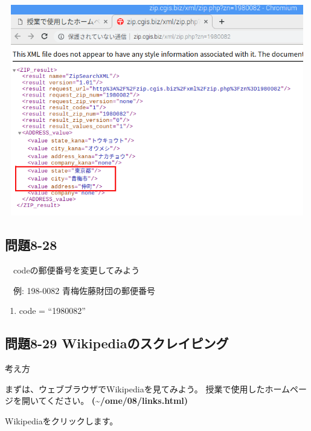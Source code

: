 \documentclass[a4paper,12pt,dvipdfmx]{jarticle}
\begin{document}
\begin{center}
\includegraphics[width=13.873cm,height=9.243cm]{textbook-img055.png}

\end{center}



\subsection*{問題8-28}
\ \ codeの郵便番号を変更してみよう

\ \ 例: 198-0082
青梅佐藤財団の郵便番号

\begin{center}
\begin{boxedminipage}{10.927cm}
\begin{enumerate}
\item code = “1980082”
\end{enumerate}
\end{boxedminipage}
\end{center}
\clearpage\subsection*{問題8-29 Wikipediaのスクレイピング}
考え方

まずは、ウェブブラウザでWikipediaを見てみよう。
授業で使用したホームページを開いてください。
\textbf{(\~{}/ome/08/links.html)}

Wikipediaをクリックします。 
\end{document}
